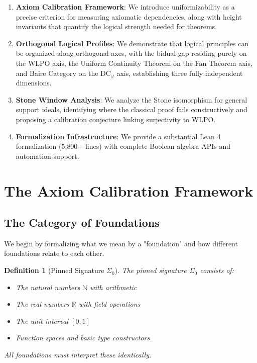 \documentclass[11pt]{article}
\newtheorem{definition}[theorem]{Definition}
\newcommand{\N}{\mathbb{N}}
\newcommand{\R}{\mathbb{R}}
\newcommand{\DCw}{\mathrm{DC}_\omega}
\newcommand{\SigmaZero}{\Sigma_{0}}
\begin{document}
\begin{enumerate}
\item \textbf{Axiom Calibration Framework}: We introduce uniformizability as a precise criterion for measuring axiomatic dependencies, along with height invariants that quantify the logical strength needed for theorems.

\item \textbf{Orthogonal Logical Profiles}: We demonstrate that logical principles can be organized along orthogonal axes, with the bidual gap residing purely on the WLPO axis, the Uniform Continuity Theorem on the Fan Theorem axis, and Baire Category on the $\DCw$ axis, establishing three fully independent dimensions.

\item \textbf{Stone Window Analysis}: We analyze the Stone isomorphism for general support ideals, identifying where the classical proof fails constructively and proposing a calibration conjecture linking surjectivity to WLPO.

\item \textbf{Formalization Infrastructure}: We provide a substantial Lean 4 formalization (5,800+ lines) with complete Boolean algebra APIs and automation support.
\end{enumerate}

\section{The Axiom Calibration Framework}

\subsection{The Category of Foundations}

We begin by formalizing what we mean by a "foundation" and how different foundations relate to each other.

\begin{definition}[Pinned Signature $\SigmaZero$]
The \emph{pinned signature} $\SigmaZero$ consists of:
\begin{itemize}
\item The natural numbers $\N$ with arithmetic
\item The real numbers $\R$ with field operations
\item The unit interval $[0,1]$
\item Function spaces and basic type constructors
\end{itemize}
All foundations must interpret these identically.
\end{definition}
\end{document}
